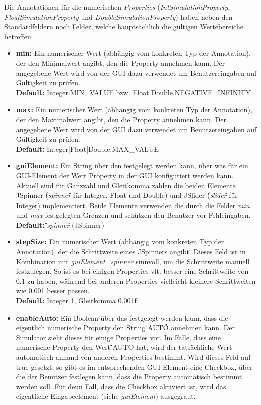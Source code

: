 \documentclass[a4paper, 11pt]{article} %
\begin{document}
Die Annotationen für die numerischen \emph{Properties} (\emph{IntSimulationProperty}, \emph{FloatSimulationProperty} und \emph{DoubleSimulationProperty}) haben neben den Standardfeldern noch Felder, welche hauptsächlich die gültigen Wertebereiche betreffen.
\begin{itemize}
	\item \textbf{min:} Ein numerischer Wert (abhängig vom konkreten Typ der Annotation), der den Minimalwert angibt, den die Property annehmen kann. Der angegebene Wert wird von der GUI dazu verwendet um Benutzereingaben auf Gültigkeit zu prüfen.\\
	\textbf{Default:} Integer.MIN\_VALUE bzw. Float|Double.NEGATIVE\_INFINITY
	\item \textbf{max:} Ein numerischer Wert (abhängig vom konkreten Typ der Annotation), der den Maximalwert angibt, den die Property annehmen kann. Der angegebene Wert wird von der GUI dazu verwendet um Benutzereingaben auf Gültigkeit zu prüfen.\\
	\textbf{Default:} Integer|Float|Double.MAX\_VALUE
	\item \textbf{guiElement:} Ein String über den festgelegt werden kann, über was für ein GUI-Element der Wert Property in der GUI konfiguriert werden kann. Aktuell sind für Ganzzahl und Gleitkomma zahlen die beiden Elemente JSpinner (\emph{\"{}spinner\"{}} für Integer, Float und Double) und JSlider (\emph{\"{}slider\"{}} für Integer) implementiert. Beide Elemente verwenden die durch die Felder \emph{min} und \emph{max} festgelegten Grenzen und schützen den Benutzer vor Fehleingaben.\\
	\textbf{Default:} \emph{\"{}spinner\"{}} (JSpinner)
	\item \textbf{stepSize:} Ein numerischer Wert (abhängig vom konkreten Typ der Annotation), der die Schrittweite eines JSpinners angibt. Dieses Feld ist in Kombination mit \emph{guiElement=\"{}spinner\"{}} sinnvoll, um die Schrittweite manuell festzulegen. So ist es bei einigen Properties vlt. besser eine Schrittweite von 0.1 zu haben, während bei anderen Properties vielleicht kleinere Schrittweiten wie 0.001 besser passen.\\
	\textbf{Default:} Integer 1, Gleitkomma 0.001f
	\item \textbf{enableAuto:} Ein Boolean über das festgelegt werden kann, dass die eigentlich numerische Property den String \"{}AUTO\"{} annehmen kann. Der Simulator sieht dieses für einige Properties vor. Im Falle, dass eine numerische Property den Wert \"{}AUTO\"{} hat, wird der tatsächliche Wert automatisch anhand von anderen Properties bestimmt. Wird dieses Feld auf true gesetzt, so gibt es im entsprechenden GUI-Element eine Checkbox, über die der Benutzer festlegen kann, dass die Property automatisch bestimmt werden soll. Für denn Fall, dass  die Checkbox aktiviert ist, wird das eigentliche Eingabeelement (siehe \emph{guiElement}) ausgegraut.\\

\end{itemize}
\end{document}
